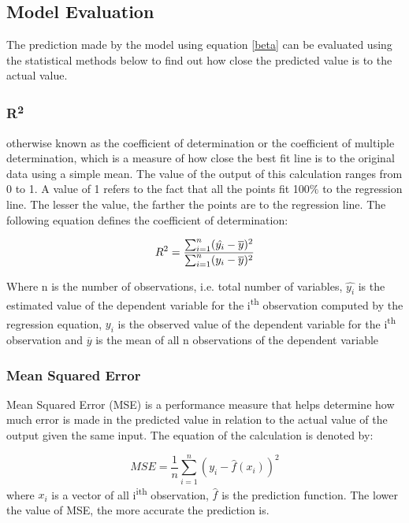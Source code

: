 \documentclass[conference]{IEEEtran}
\begin{document}
\subsection{Model Evaluation}
The prediction made by the model using equation \eqref{beta} can be evaluated using the statistical methods below to find out how close the predicted value is to the actual value.
\subsubsection{R\textsuperscript{2}}
otherwise known as the coefficient of determination or the coefficient of multiple determination, which is a measure of how close the best fit line is to the original data using a simple mean. The value of the output of this calculation ranges from 0 to 1\cite{DAE79009}. A value of 1 refers to the fact that all the points fit 100$\%$ to the regression line. The lesser the value, the farther the points are to the regression line. The following equation defines the coefficient of determination:

	\begin{equation}
		R\textsuperscript{2} = \label{three}\frac{\sum_{i=1}^{n}(\hat{y_i}-\overline{y})^2}{\sum_{i=1}^{n}(y_i-\overline{y})^2}
	\end{equation}
	
	Where n is the number of observations, i.e. total number of variables, $\hat{y_i}$ is the estimated value of the dependent variable for the i\textsuperscript{th} observation computed by the regression equation, $y_i$ is the observed value of the dependent variable for the i\textsuperscript{th} observation and $\overline{y}$ is the mean of all n observations of the dependent variable \cite{DAE79009}

\subsubsection{Mean Squared Error}
Mean Squared Error (MSE) is a performance measure that helps determine how much error is made in the predicted value in relation to the actual value of the output given the same input. The equation of the calculation is denoted by:

	\begin{equation}
		MSE = \label{four}\frac{1}{n}\sum_{i=1}^{n}(y_i-\hat{f}(x_i))^2
	\end{equation}
	where $x_i$ is a vector of all i\textsuperscript{ith} observation, $\hat{f}$ is the prediction function. The lower the value of MSE, the more accurate the prediction is.
	
\end{document}
